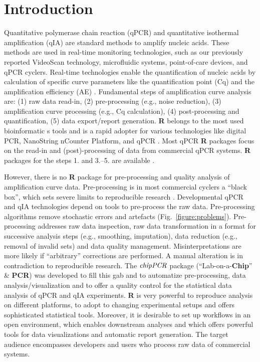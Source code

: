 \documentclass{bioinfo}
\begin{document}
\section{Introduction}

Quantitative polymerase chain reaction (qPCR) and quantitative isothermal 
amplification (qIA) are standard methods to amplify nucleic acids. These methods 
are used in real-time monitoring technologies, such as our previously reported 
VideoScan technology, microfluidic systems, point-of-care devices, and qPCR 
cyclers. Real-time technologies enable the quantification of nucleic acids by 
calculation of specific curve parameters like the quantification point (Cq) and 
the amplification efficiency (AE) 
\citep{roediger_highly_2013,rodiger_nucleic_2014,pabinger_2014}. Fundamental 
steps of amplification curve analysis are: (1) raw data read-in, (2) 
pre-processing (e.g., noise reduction), (3) amplification curve processing 
(e.g., Cq calculation), (4) post-processing and quantification, (5) data 
export/report generation. \textbf{R} belongs to the most used bioinformatic	
s tools and is a rapid adopter for various technologies like digital PCR, 
NanoString nCounter Platform, and qPCR \citep{waggott_2012,pabinger_2014}. Most 
qPCR \textbf{R} packages focus on the read-in and (post)-processing of data from 
commercial qPCR systems. \textbf{R} packages for the steps 1. and 3.--5. are 
available \citep{pabinger_2014,perkins_2012,mccall_2014,gehlenborg_2013}.

However, there is no \textbf{R} package for pre-processing and quality analysis 
of amplification curve data. Pre-processing is in most commercial cyclers a 
``black box'', which sets severe limits to reproducible research 
\citep{Leeper_2014}. Developmental qPCR and qIA technologies depend on tools to 
pre-process the raw data. Pre-processing algorithms remove stochastic errors and 
artefacts (Fig.~\ref{figure:problems}). Pre-processing addresses raw data 
inspection, raw data transformation in a format for successive analysis steps 
(e.g., smoothing, imputation), data reduction (e.g., removal of invalid sets) 
and data quality management. Misinterpretations are more likely if ``arbitrary'' 
corrections are performed. A manual alteration is in contradiction to 
reproducible research. The $\emph{chipPCR}$ package (``Lab-on-a-\textbf{Chip}'' 
\& \textbf{PCR}) was developed to fill this gab and to automatize 
pre-processing, data analysis/visualization and to offer a quality control for 
the statistical data analysis of qPCR and qIA experiments. \textbf{R} is very 
powerful to reproduce analysis on different platforms, to adopt to changing 
experimental setups and offers sophisticated statistical tools. Moreover, it is 
desirable to set up workflows in an open environment, which enables downstream 
analyses and which offers powerful tools for data visualizations and automatic 
report generation. The target audience encompasses developers and users who 
process raw data of commercial systems.
\end{document}
